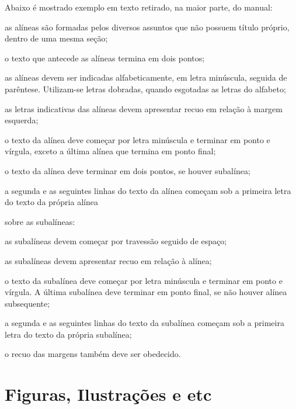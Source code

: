 Abaixo é mostrado exemplo em texto retirado, na maior parte, do manual:
\begin{alineas}
	\item as alíneas são formadas pelos diversos assuntos que não possuem título próprio, dentro de uma mesma seção;
	\item o texto que antecede as alíneas termina em dois pontos;
	\item as alíneas devem ser indicadas alfabeticamente, em letra minúscula, seguida de parêntese. Utilizam-se letras dobradas, quando esgotadas as letras do alfabeto;
	\item as letras indicativas das alíneas devem apresentar recuo em relação à margem esquerda;
	\item o texto da alínea deve começar por letra minúscula e terminar em ponto e vírgula, exceto a última alínea que termina em ponto final;
	\item o texto da alínea deve terminar em dois pontos, se houver subalínea;
	\item a segunda e as seguintes linhas do texto da alínea começam sob a primeira letra do texto da própria alínea
	
	\item sobre as subalíneas:
	\begin{alineas}
		\item as subalíneas devem começar por travessão seguido de espaço;
		\item as subalíneas devem apresentar recuo em relação à alínea;
		\item o texto da subalínea deve começar por letra minúscula e terminar em ponto e vírgula. A última subalínea deve terminar em ponto final, se não houver alínea subsequente;
		\item a segunda e as seguintes linhas do texto da subalínea começam sob a primeira letra do texto da própria subalínea;
		\item o recuo das margens também deve ser obedecido.
	\end{alineas}
\end{alineas}


\section{Figuras, Ilustrações e etc}

